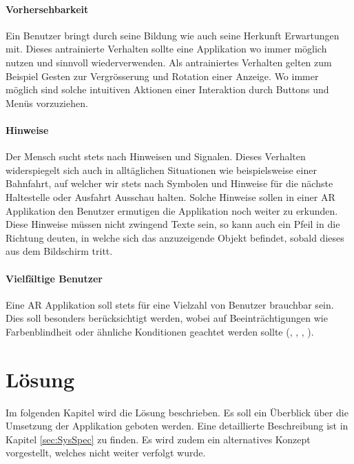\documentclass[a4paper]{scrreprt}
\begin{document}
\subsubsection{Vorhersehbarkeit}
Ein Benutzer bringt durch seine Bildung wie auch seine Herkunft Erwartungen mit. Dieses antrainierte Verhalten sollte eine Applikation wo immer möglich nutzen und sinnvoll wiederverwenden. Als antrainiertes Verhalten gelten zum Beispiel Gesten zur Vergrösserung und Rotation einer Anzeige. Wo immer möglich sind solche intuitiven Aktionen einer Interaktion durch Buttons und Menüs vorzuziehen.

\subsubsection{Hinweise}
Der Mensch sucht stets nach Hinweisen und Signalen. Dieses Verhalten widerspiegelt sich auch in alltäglichen Situationen wie beispielsweise einer Bahnfahrt, auf welcher wir stets nach Symbolen und Hinweise für die nächste Haltestelle oder Ausfahrt Ausschau halten.
Solche Hinweise sollen in einer AR Applikation den Benutzer ermutigen die Applikation noch weiter zu erkunden.
Diese Hinweise müssen nicht zwingend Texte sein, so kann auch ein Pfeil in die Richtung deuten, in welche sich das anzuzeigende Objekt befindet, sobald dieses aus dem Bildschirm tritt.

\subsubsection{Vielfältige Benutzer}
Eine AR Applikation soll stets für eine Vielzahl von Benutzer brauchbar sein. Dies soll besonders berücksichtigt werden, wobei auf Beeinträchtigungen wie Farbenblindheit oder ähnliche Konditionen geachtet werden sollte (\cite{AppleGuideline2018}, \cite{GoogleGuideline2018}, \cite{GoogleIO2018}, \cite{BerfinAyhan2017}).

\chapter{Lösung}
Im folgenden Kapitel wird die Lösung beschrieben. Es soll ein Überblick über die Umsetzung der Applikation geboten werden. Eine detaillierte Beschreibung ist in Kapitel \ref{sec:SysSpec} zu finden. Es wird zudem ein alternatives Konzept vorgestellt, welches nicht weiter verfolgt wurde.
\end{document}
